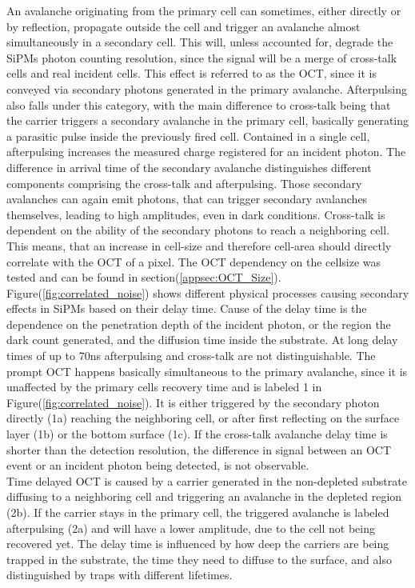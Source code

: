 \documentclass[12pt,article,type=msc,colorback,accentcolor=tud9c]{tudthesis}
\begin{document}
An avalanche originating from the primary cell can sometimes, either directly or by reflection, propagate outside the cell and trigger an avalanche almost simultaneously in a secondary cell. This will, unless accounted for, degrade the SiPMs photon counting resolution, since the signal will be a merge of cross-talk cells and real incident cells. This effect is referred to as the OCT, since it is conveyed via secondary photons generated in the primary avalanche. Afterpulsing also falls under this category, with the main difference to cross-talk being that the carrier triggers a secondary avalanche in the primary cell, basically generating a parasitic pulse inside the previously fired cell. Contained in a single cell, afterpulsing increases the measured charge registered for an incident photon. The difference in arrival time of the secondary avalanche distinguishes different components comprising the cross-talk and afterpulsing. Those secondary avalanches can again emit photons, that can trigger secondary avalanches themselves, leading to high amplitudes, even in dark conditions. Cross-talk is dependent on the ability of the secondary photons to reach a neighboring cell. This means, that an increase in cell-size and therefore cell-area should directly correlate with the OCT of a pixel. The OCT dependency on the cellsize was tested and can be found in section(\ref{appsec:OCT_Size}).\\
Figure(\ref{fig:correlated_noise}) shows different physical processes causing secondary effects in SiPMs based on their delay time. Cause of the delay time is the dependence on the penetration depth of the incident photon, or the region the dark count generated, and the diffusion time inside the substrate. At long delay times of up to 70ns afterpulsing and cross-talk are not distinguishable.\cite{ModelCTAP} The prompt OCT happens basically simultaneous to the primary avalanche, since it is unaffected by the primary cells recovery time and is labeled 1 in Figure(\ref{fig:correlated_noise}). It is either triggered by the secondary photon directly (1a) reaching the neighboring cell, or after first reflecting on the surface layer (1b) or the bottom surface (1c). If the cross-talk avalanche delay time is shorter than the detection resolution, the difference in signal between an OCT event or an incident photon being detected, is not observable.\\
Time delayed OCT is caused by a carrier generated in the non-depleted substrate diffusing to a neighboring cell and triggering an avalanche in the depleted region (2b). If the carrier stays in the primary cell, the triggered avalanche is labeled afterpulsing (2a) and will have a lower amplitude, due to the cell not being recovered yet. The delay time is influenced by how deep the carriers are being trapped in the substrate, the time they need to diffuse to the surface, and also distinguished by traps with different lifetimes.\\
\end{document}
